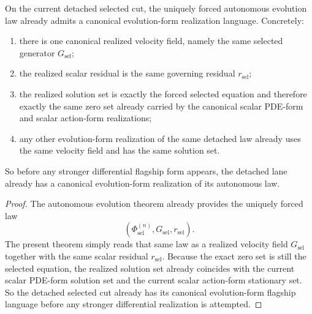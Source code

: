 \begin{theorem}
\label{thm:the-selected-cut-already-admits-one-canonical-evolution-form-realization}
On the current detached selected cut, the uniquely forced autonomous evolution
law already admits a canonical evolution-form realization language. Concretely:
\begin{enumerate}
\item there is one canonical realized velocity field, namely the same selected
      generator \(G_{\mathrm{sel}}\);
\item the realized scalar residual is the same governing residual
      \(r_{\mathrm{sel}}\);
\item the realized solution set is exactly the forced selected equation and
      therefore exactly the same zero set already carried by the canonical
      scalar PDE-form and scalar action-form realizations;
\item any other evolution-form realization of the same detached law already
      uses the same velocity field and has the same solution set.
\end{enumerate}
So before any stronger differential flagship form appears, the detached lane
already has a canonical evolution-form realization of its autonomous law.
\end{theorem}

\begin{proof}
The autonomous evolution theorem already provides the uniquely forced law
\[
(\Phi_{\mathrm{sel}}^{(n)},G_{\mathrm{sel}},r_{\mathrm{sel}}).
\]
The present theorem simply reads that same law as a realized velocity
field \(G_{\mathrm{sel}}\) together with the same scalar residual
\(r_{\mathrm{sel}}\). Because the exact zero set is still the selected
equation, the realized solution set already coincides with the current scalar
PDE-form solution set and the current scalar action-form stationary set. So
the detached selected cut already has its canonical evolution-form flagship
language before any stronger differential realization is attempted.
\end{proof}

